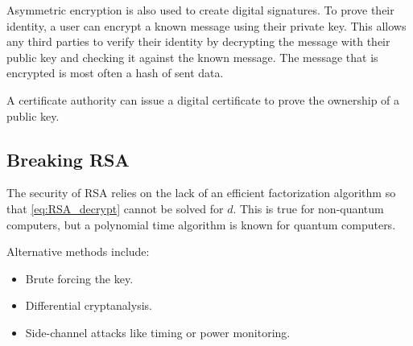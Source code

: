 Asymmetric encryption is also used to create digital signatures. To prove their identity, a user can encrypt a known message using their private key. This allows any third parties to verify their identity by decrypting the message with their public key and checking it against the known message. The message that is encrypted is most often a hash of sent data.

A certificate authority can issue a digital certificate to prove the ownership of a public key.

\subsection{Breaking RSA}
The security of RSA relies on the lack of an efficient factorization algorithm so that \cref{eq:RSA_decrypt} cannot be solved for \(d\). This is true for non-quantum computers, but a polynomial time algorithm is known for quantum computers.

Alternative methods include:
\begin{itemize}
    \item Brute forcing the key.
    \item Differential cryptanalysis.
    \item Side-channel attacks like timing or power monitoring.
\end{itemize}
